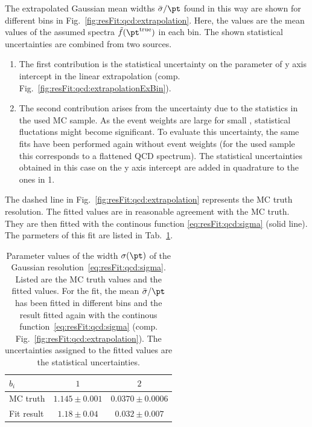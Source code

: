 \documentclass[a4paper]{cmspaper} %
\newcommand{\truth}{\ensuremath{\pt^{\text{true}}}\xspace}
\begin{document}
The extrapolated Gaussian mean widths $\bar{\sigma}/\pt$ found in this way are shown for different \pt bins in Fig.~\ref{fig:resFit:qcd:extrapolation}.
Here, the \pt values are the mean values of the assumed spectra $\tilde{f}(\truth)$ in each bin.
The shown statistical uncertainties are combined from two sources.
\begin{enumerate}
\item The first contribution is the statistical uncertainty on the
  parameter of y axis intercept in the linear extrapolation (comp.
  Fig.~\ref{fig:resFit:qcd:extrapolationExBin}).
\item The second contribution arises from the uncertainty due to the statistics in
  the used MC sample.
  As the event weights are large for small \pt, statistical fluctations might become significant.
  To evaluate this uncertainty, the same fits have been performed again without event weights (for the used sample this corresponds to a flattened QCD spectrum).
  The statistical uncertainties obtained in this case on the y axis intercept are added in quadrature to the ones in 1.
\end{enumerate}

The dashed line in Fig.~\ref{fig:resFit:qcd:extrapolation} represents the MC truth resolution.
The fitted values are in reasonable agreement with the MC truth.
They are then fitted with the continous function \eqref{eq:resFit:qcd:sigma} (solid line).
The parmeters of this fit are listed in Tab.~\ref{tab:resFit:qcd:resolution}.

\begin{table}[ht]
  \centering
  \begin{tabular}[ht]{lcc}
    \hline \hline
    $b_{i}$ & $1$ & $2$ \\
    \hline
    MC truth    & $1.145 \pm 0.001$ & $0.0370 \pm 0.0006$ \\
    Fit result  & $1.18  \pm 0.04$  & $0.032  \pm 0.007$ \\
    \hline \hline
  \end{tabular}
  \caption{Parameter values of the width $\sigma(\pt)$ of the Gaussian resolution~\eqref{eq:resFit:qcd:sigma}.
    Listed are the MC truth values and the fitted values.
    For the fit, the mean $\bar{\sigma}/\pt$ has been fitted in different \pt bins and the result fitted again with the continous function~\eqref{eq:resFit:qcd:sigma} (comp. Fig.~\ref{fig:resFit:qcd:extrapolation}).
    The uncertainties assigned to the fitted values are the statistical uncertainties.}
  \label{tab:resFit:qcd:resolution}
\end{table}
\end{document}
